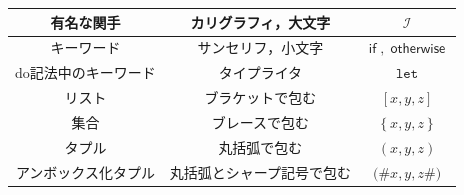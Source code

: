 \documentclass[a4paper,twocolumn]{jsbook}
\newcommand{\mKeyword}[1]{\mathsf{#1}} %
\newcommand{\mVarKeyword}[1]{\texttt{#1}}
\newcommand{\mDoLetKeyword}{\mVarKeyword{let}}
\newcommand{\mIfKeyword}{\mKeyword{if}}
\newcommand{\mOtherwiseKeyword}{\mKeyword{otherwise}}
\DeclareMathOperator{\mIf}{\mIfKeyword}
\DeclareMathOperator{\mOtherwise}{\mOtherwiseKeyword}
\newcommand{\mListWith}[1]{\left[#1\right]}
\newcommand{\mSetWith}[1]{\left\{#1\right\}}
\newcommand{\mTupleWith}[1]{\left(#1\right)}
\newcommand{\mTupleUnboxedWith}[1]{\texttt{(\#}#1\texttt{\#)}}
\newcommand{\mSpecialFunctor}[1]{\mathcal{#1}} %
\DeclareMathOperator{\mIFunctor}{\mSpecialFunctor{I}}
\begin{document}
\begin{table}[p]
\begin{center}
\begin{tabular}{||c|c|c||}
有名な関手&カリグラフィ，大文字&$\mIFunctor$\\
\hline
キーワード&サンセリフ，小文字&$\mIf,\mOtherwise$\\
do記法中のキーワード&タイプライタ&$\mDoLetKeyword$\\
\hline
リスト&ブラケットで包む&$\mListWith{x,y,z}$\\
集合&ブレースで包む&$\mSetWith{x,y,z}$\\
タプル&丸括弧で包む&$\mTupleWith{x,y,z}$\\
アンボックス化タプル&丸括弧とシャープ記号で包む&$\mTupleUnboxedWith{x,y,z}$\\
\hline
\end{tabular}
\end{center}
\end{table}
\end{document}
